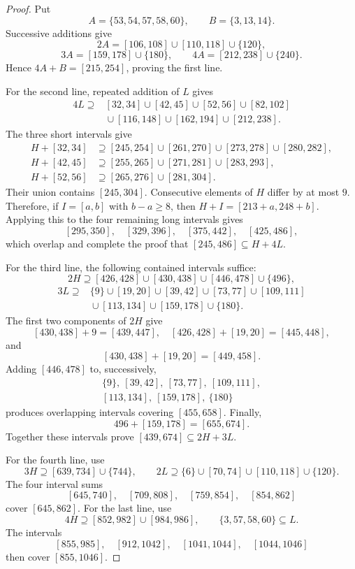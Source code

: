\documentclass[12pt]{article}
\theoremstyle{plain}
\begin{document}
\begin{proof}
Put
\[
 A=\{53,54,57,58,60\},\qquad B=\{3,13,14\}.
\]
Successive additions give
\[
 2A=[106,108]\cup[110,118]\cup\{120\},
\]
\[
 3A=[159,178]\cup\{180\},\qquad
 4A=[212,238]\cup\{240\}.
\]
Hence $4A+B=[215,254]$, proving the first line.

For the second line, repeated addition of $L$ gives
\[
\begin{split}
4L\supseteq{}&[32,34]\cup[42,45]\cup[52,56]\cup[82,102]\\
 &{}\cup[116,148]\cup[162,194]\cup[212,238].
\end{split}
\]
The three short intervals give
\[
\begin{aligned}
H+[32,34]&\supseteq[245,254]\cup[261,270]
 \cup[273,278]\cup[280,282],\\
H+[42,45]&\supseteq[255,265]\cup[271,281]\cup[283,293],\\
H+[52,56]&\supseteq[265,276]\cup[281,304].
\end{aligned}
\]
Their union contains $[245,304]$.  Consecutive elements of $H$ differ
by at most $9$.  Therefore, if $I=[a,b]$ with $b-a\geq8$, then
$H+I=[213+a,248+b]$.  Applying this to the four remaining long
intervals gives
\[
 [295,350],\quad[329,396],\quad[375,442],\quad[425,486],
\]
which overlap and complete the proof that $[245,486]\subseteq H+4L$.

For the third line, the following contained intervals suffice:
\[
 2H\supseteq[426,428]\cup[430,438]\cup[446,478]\cup\{496\},
\]
\[
\begin{split}
3L\supseteq{}&\{9\}\cup[19,20]\cup[39,42]\cup[73,77]
 \cup[109,111]\\
 &{}\cup[113,134]\cup[159,178]\cup\{180\}.
\end{split}
\]
The first two components of $2H$ give
\[
 [430,438]+9=[439,447],\quad
 [426,428]+[19,20]=[445,448],
\]
and
\[
 [430,438]+[19,20]=[449,458].
\]
Adding $[446,478]$ to, successively,
\[
\begin{gathered}
 \{9\},\ [39,42],\ [73,77],\ [109,111],\\
 [113,134],\ [159,178],\ \{180\}
\end{gathered}
\]
produces overlapping intervals covering $[455,658]$.  Finally,
\[
 496+[159,178]=[655,674].
\]
Together these intervals prove $[439,674]\subseteq2H+3L$.

For the fourth line, use
\[
 3H\supseteq[639,734]\cup\{744\},\qquad
 2L\supseteq\{6\}\cup[70,74]\cup[110,118]\cup\{120\}.
\]
The four interval sums
\[
 [645,740],\quad[709,808],\quad[759,854],\quad[854,862]
\]
cover $[645,862]$.  For the last line, use
\[
 4H\supseteq[852,982]\cup[984,986],
 \qquad \{3,57,58,60\}\subseteq L.
\]
The intervals
\[
 [855,985],\quad[912,1042],\quad[1041,1044],\quad[1044,1046]
\]
then cover $[855,1046]$.
\end{proof}
\end{document}
